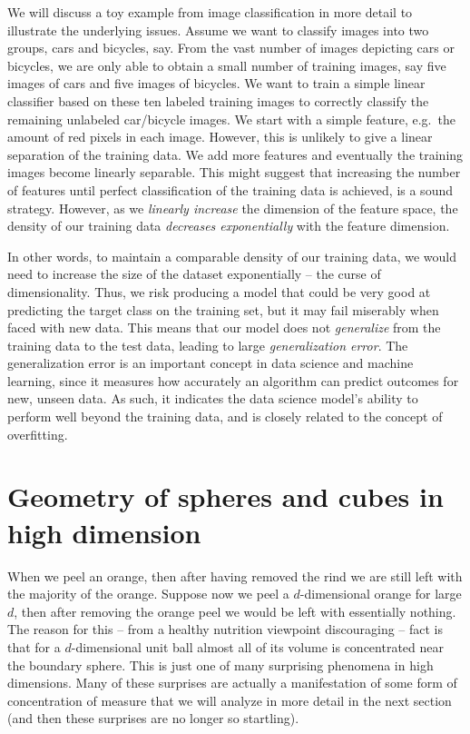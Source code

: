 We will discuss a toy example from image classification in more detail to illustrate the underlying issues.
Assume we want to classify images into two groups, cars and bicycles, say. From the vast number of images depicting cars or bicycles, we are only able to obtain a small number of training images, say five images of cars and five images of bicycles. We want to train a simple linear classifier based on these ten labeled training images to correctly classify the remaining unlabeled car/bicycle images. We start with a simple feature, e.g.\ the amount of red pixels in each image.
However, this is unlikely to give a linear separation of the training data. We add more features and eventually the training images become linearly separable. This might suggest that increasing the number of features until perfect classification of the training data is achieved, is a sound strategy. However, as we {\em linearly increase} the dimension of the feature space, the density of our training data {\em decreases exponentially} with the feature dimension.

In other words, to maintain a comparable density of our training data, we would need to increase the size of the dataset exponentially -- the curse of dimensionality.
Thus, we risk producing a model that could be very good at predicting the target class on the training set, but it may fail miserably when faced with new data.  This means that our model does not {\em generalize} from the training data to the test data, leading to large {\em generalization error}.  The generalization error is an important concept in data science and machine learning, since it measures how accurately an algorithm can predict outcomes for new, unseen data.  As such, it indicates the data science model's ability to perform well beyond the training data, and is closely related to the concept of overfitting.


\section{Geometry of spheres and cubes in high dimension}

When we peel an orange, then after having removed the rind we are still left with the majority of the orange. Suppose now we peel a $d$-dimensional orange for large $d$, then after removing the orange peel we would be left with essentially nothing.
The reason for this -- from a healthy nutrition viewpoint discouraging -- fact is that for a $d$-dimensional unit ball almost all of its volume is concentrated near the boundary sphere. This is just one of many surprising phenomena in high dimensions. Many of these surprises are actually a manifestation of some form of concentration of measure that we will analyze in more detail in the next section (and then these surprises are no longer so startling).


